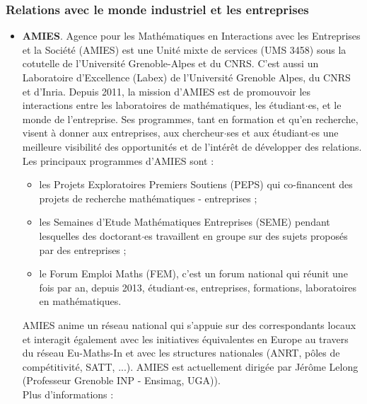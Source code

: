 \subsubsection{Relations avec le monde industriel et les entreprises}

\begin{itemize}
\item {\bf AMIES}.
Agence pour les Math\'ematiques en Interactions avec les Entreprises et la Soci\'et\'e (AMIES) est une Unit\'e mixte de services (UMS 3458) sous la cotutelle de l'Universit\'e Grenoble-Alpes et du CNRS. C'est aussi un Laboratoire d'Excellence (Labex) de l'Universit\'e Grenoble Alpes, du CNRS et d'Inria. Depuis 2011, la mission d'AMIES est de promouvoir les interactions entre les laboratoires de 	math\'ematiques, les \'etudiant$\cdot$es, et le monde de l'entreprise. Ses programmes, tant en formation et qu'en recherche, visent \`a donner aux entreprises, aux chercheur$\cdot$ses et aux \'etudiant$\cdot$es une meilleure 	visibilit\'e des opportunit\'es et de l'int\'er\^et de d\'evelopper des relations. Les principaux programmes d'AMIES sont :
	\begin{itemize}
	\item les Projets Exploratoires Premiers Soutiens (PEPS) qui co-financent des projets de recherche math\'ematiques - entreprises ;
	\item les Semaines d'Etude Math\'ematiques Entreprises (SEME) pendant lesquelles des doctorant$\cdot$es travaillent en groupe sur des sujets propos\'es par des entreprises ;
	\item le Forum Emploi Maths (FEM), c'est un forum national qui r\'eunit une fois par an, depuis 2013, \'etudiant$\cdot$es, entreprises, formations, laboratoires en math\'ematiques. 
	\end{itemize}
AMIES anime un r\'eseau national qui s'appuie sur des correspondants locaux et interagit \'egalement avec les initiatives \'equivalentes en Europe au travers du r\'eseau Eu-Maths-In et avec les structures	nationales (ANRT, p\^oles de comp\'etitivit\'e, SATT, ...). AMIES est actuellement dirig\'ee par J\'er\^ome Lelong (Professeur Grenoble INP - Ensimag, UGA)).
\\Plus d'informations :  
\end{itemize}

